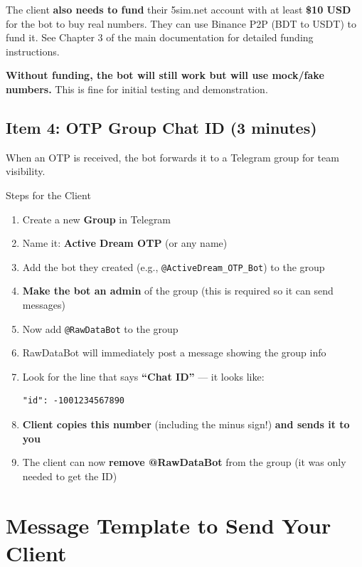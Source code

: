 \begin{importantbox}
The client \textbf{also needs to fund} their 5sim.net account with at least \textbf{\$10 USD} for the bot to buy real numbers. They can use Binance P2P (BDT to USDT) to fund it. See Chapter 3 of the main documentation for detailed funding instructions.

\textbf{Without funding, the bot will still work but will use mock/fake numbers.} This is fine for initial testing and demonstration.
\end{importantbox}

\subsection{Item 4: OTP Group Chat ID (3 minutes)}

When an OTP is received, the bot forwards it to a Telegram group for team visibility.

\begin{stepbox}{Steps for the Client}
\begin{enumerate}[leftmargin=1.5cm]
    \item Create a new \textbf{Group} in Telegram
    \item Name it: \textbf{Active Dream OTP} (or any name)
    \item Add the bot they created (e.g., \texttt{@ActiveDream\_OTP\_Bot}) to the group
    \item \textbf{Make the bot an admin} of the group (this is required so it can send messages)
    \item Now add \texttt{@RawDataBot} to the group
    \item RawDataBot will immediately post a message showing the group info
    \item Look for the line that says \textbf{``Chat ID''} --- it looks like:
    \begin{lstlisting}[style=termstyle]
"id": -1001234567890
    \end{lstlisting}
    \item \textbf{Client copies this number} (including the minus sign!) \textbf{and sends it to you}
    \item The client can now \textbf{remove @RawDataBot} from the group (it was only needed to get the ID)
\end{enumerate}
\end{stepbox}

\section{Message Template to Send Your Client}


